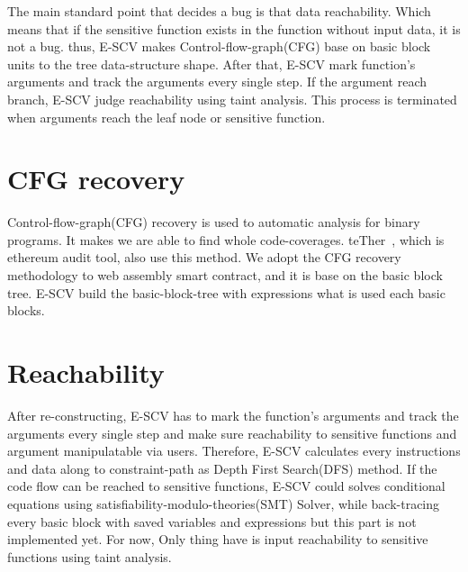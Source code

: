 The main standard point that decides a bug is that data reachability. Which means that if the sensitive function exists in the function without input data, it is not a bug. thus, E-SCV makes Control-flow-graph(CFG) base on basic block units to the tree data-structure shape. After that, E-SCV mark function's arguments and track the arguments every single step. If the argument reach branch, E-SCV judge reachability using taint analysis. This process is terminated when arguments reach the leaf node or sensitive function. 

\section{CFG recovery}
Control-flow-graph(CFG) recovery is used to automatic analysis for binary programs. It makes we are able to find whole code-coverages. teTher~\cite{krupp2018teether}, which is ethereum audit tool, also use this method. We adopt the CFG recovery methodology to web assembly smart contract, and it is base on the basic block tree. E-SCV build the basic-block-tree with expressions what is used each basic blocks.



\section{Reachability}
After re-constructing, E-SCV has to mark the function's arguments and track the arguments every single step and make sure reachability to sensitive functions and argument manipulatable via users. Therefore, E-SCV calculates every instructions and data along to constraint-path as Depth First Search(DFS) method. If the code flow can be reached to sensitive functions, E-SCV could solves conditional equations using satisfiability-modulo-theories(SMT) Solver, while back-tracing every basic block with saved variables and expressions but this part is not implemented yet. For now, Only thing have is input reachability to sensitive functions using taint analysis.


